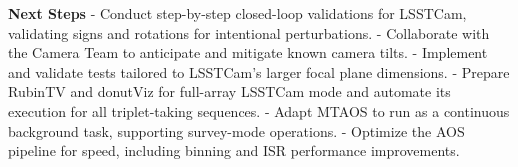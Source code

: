 \textbf{Next Steps}
- Conduct step-by-step closed-loop validations for LSSTCam, validating signs and rotations for intentional perturbations.
- Collaborate with the Camera Team to anticipate and mitigate known camera tilts.
- Implement and validate tests tailored to LSSTCam's larger focal plane dimensions.
- Prepare RubinTV and donutViz for full-array LSSTCam mode and automate its execution for all triplet-taking sequences.
- Adapt MTAOS to run as a continuous background task, supporting survey-mode operations.
- Optimize the AOS pipeline for speed, including binning and ISR performance improvements.



